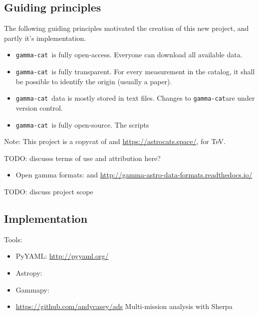\documentclass[11pt,twoside]{article}
\newcommand{\gammacat}{\texttt{gamma-cat}}
\begin{document}
\subsection{Guiding principles}

The following guiding principles motivated the creation of this new project, and partly it's implementation.

\begin{itemize}
\item \gammacat\ is fully open-access. Everyone can download all available data.
\item \gammacat\ is fully transparent. For every measurement in the catalog, it shall be possible to identify the origin (usually a paper).
\item \gammacat\ data is mostly stored in text files. Changes to \gammacat are under version control.
\item \gammacat\ is fully open-source. The scripts
\end{itemize}


Note: This project is a copycat of \citet{sne-cat} and \url{https://astrocats.space/}, for TeV.

TODO: discusss terms of use and attribution here?

\begin{itemize}
\item Open gamma formats: \citet{open-gamma} and \url{http://gamma-astro-data-formats.readthedocs.io/}
\end{itemize}

TODO: discuss project scope


\subsection{Implementation}

Tools:

\begin{itemize}
\item PyYAML: \url{http://pyyaml.org/}
\item Astropy: \citet{astropy}
\item Gammapy: \citet{gammapy}
\item \url{https://github.com/andycasey/ads}
Multi-mission analysis with Sherpa \citep{sherpa}
\end{itemize}
\end{document}
